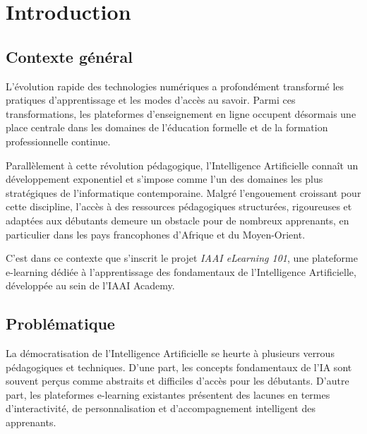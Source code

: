 \documentclass[12pt, a4paper]{report}
\begin{document}
\chapter{Introduction}
\onehalfspacing
\section{Contexte général}
L'évolution rapide des technologies numériques a profondément transformé les pratiques d'apprentissage et les modes d'accès au savoir. Parmi ces transformations, les plateformes d'enseignement en ligne occupent désormais une place centrale dans les domaines de l'éducation formelle et de la formation professionnelle continue.

Parallèlement à cette révolution pédagogique, l'Intelligence Artificielle connaît un développement exponentiel et s'impose comme l'un des domaines les plus stratégiques de l'informatique contemporaine. Malgré l'engouement croissant pour cette discipline, l'accès à des ressources pédagogiques structurées, rigoureuses et adaptées aux débutants demeure un obstacle pour de nombreux apprenants, en particulier dans les pays francophones d'Afrique et du Moyen-Orient.

C'est dans ce contexte que s'inscrit le projet \textit{IAAI eLearning 101}, une plateforme e-learning dédiée à l'apprentissage des fondamentaux de l'Intelligence Artificielle, développée au sein de l'IAAI Academy.

\section{Problématique}
La démocratisation de l'Intelligence Artificielle se heurte à plusieurs verrous pédagogiques et techniques. D'une part, les concepts fondamentaux de l'IA sont souvent perçus comme abstraits et difficiles d'accès pour les débutants. D'autre part, les plateformes e-learning existantes présentent des lacunes en termes d'interactivité, de personnalisation et d'accompagnement intelligent des apprenants.
\end{document}
